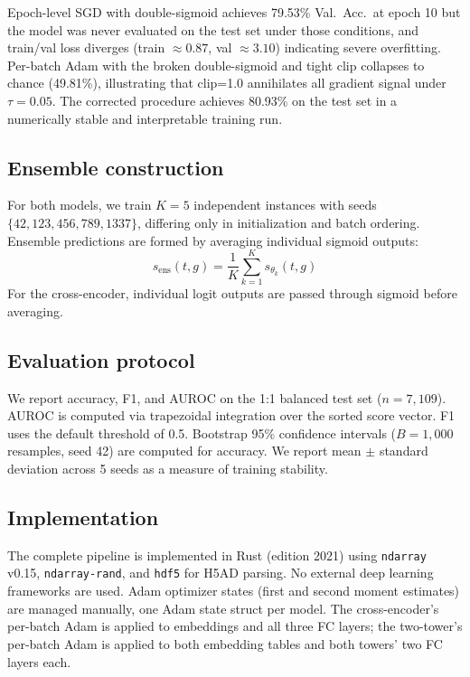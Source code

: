 \documentclass[10pt,twocolumn]{article}
\begin{document}
Epoch-level SGD with double-sigmoid achieves 79.53\% Val.\ Acc.\ at epoch 10
but the model was never evaluated on the test set under those conditions, and
train/val loss diverges (train $\approx 0.87$, val $\approx 3.10$) indicating
severe overfitting.
Per-batch Adam with the broken double-sigmoid and tight clip collapses to
chance (49.81\%), illustrating that clip=1.0 annihilates all gradient signal
under $\tau = 0.05$.
The corrected procedure achieves 80.93\% on the test set in a numerically
stable and interpretable training run.

\subsection{Ensemble construction}
\label{sec:ensemble_method}

For both models, we train $K = 5$ independent instances with seeds
$\{42, 123, 456, 789, 1337\}$, differing only in initialization and batch
ordering.
Ensemble predictions are formed by averaging individual sigmoid outputs:
\begin{equation}
    s_{\text{ens}}(t, g) = \frac{1}{K}\sum_{k=1}^{K} s_{\theta_k}(t, g)
\end{equation}
For the cross-encoder, individual logit outputs are passed through sigmoid
before averaging.

\subsection{Evaluation protocol}
\label{sec:evaluation}

We report accuracy, F1, and AUROC on the 1:1 balanced test set ($n = 7{,}109$).
AUROC is computed via trapezoidal integration over the sorted score vector.
F1 uses the default threshold of 0.5.
Bootstrap 95\% confidence intervals ($B = 1{,}000$ resamples, seed 42) are
computed for accuracy.
We report mean $\pm$ standard deviation across 5 seeds as a measure of training
stability.

\subsection{Implementation}
\label{sec:implementation}

The complete pipeline is implemented in Rust (edition 2021) using
\texttt{ndarray} v0.15, \texttt{ndarray-rand}, and \texttt{hdf5} for H5AD
parsing.
No external deep learning frameworks are used.
Adam optimizer states (first and second moment estimates) are managed manually,
one Adam state struct per model.
The cross-encoder's per-batch Adam is applied to embeddings and all three FC
layers; the two-tower's per-batch Adam is applied to both embedding tables and
both towers' two FC layers each.
\end{document}
